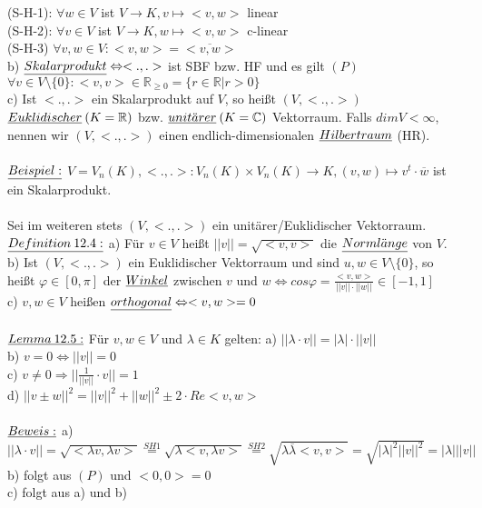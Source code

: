 \documentclass[fleqn, a4paper, 11pt]{article}
\begin{document}
(S-H-1): $\forall w\in V$ ist $V\rightarrow K,v\mapsto <v,w>$ linear\\
(S-H-2): $\forall v\in V$ ist $V\rightarrow K,w\mapsto <v,w>$ c-linear\\
(S-H-3) $\forall v,w\in V:<v,w>=\overline{<v,w>}$\\
b) $\uline{Skalarprodukt}\Leftrightarrow <.,.>$ ist SBF bzw. HF und es gilt $(P)$ $\forall v\in V\setminus\{0\}:<v,v>\in\mathbb{R}_{\geq 0}=\{r\in\mathbb{R}|r>0\}$\\
c) Ist $<.,.>$ ein Skalarprodukt auf $V$, so hei\ss{}t $(V,<.,.>)$ $\uline{Euklidischer}\:(K=\mathbb{R})$ bzw. $\uline{unit\ddot{a}rer}\:(K=\mathbb{C})$ Vektorraum. Falls $dim V<\infty$, nennen wir $(V,<.,.>)$ einen endlich-dimensionalen $\uline{Hilbertraum}$ (HR).\\
\\
$\uline{Beispiel:}$ $V=V_n(K),<.,.>:V_n(K)\times V_n(K)\rightarrow K,(v,w)\mapsto v^t\cdot \overline{w}$ ist ein Skalarprodukt.\\
\\
Sei im weiteren stets $(V,<.,.>)$ ein unit\"arer/Euklidischer Vektorraum.\\
$\uline{Definition\:12.4:}$ a) F\"ur $v\in V$ hei\ss{}t $||v||=\sqrt{<v,v>}$ die $\uline{Norml\ddot{a}nge}$ von $V$.\\
b) Ist $(V,<.,.>)$ ein Euklidischer Vektorraum und sind $u,w\in V\setminus\{0\}$, so hei\ss{}t $\varphi\in[0,\pi]$ der $\uline{Winkel}$ zwischen $v$ und $w\Leftrightarrow cos\varphi=\tfrac{<v,w>}{||v||\cdot||w||}\in [-1,1]$\\
c) $v,w\in V$ hei\ss{}en $\uline{orthogonal}\Leftrightarrow <v,w>=0$\\
\\
$\uline{Lemma\:12.5:}$ F\"ur $v,w\in V$ und $\lambda\in K$ gelten: a) $||\lambda\cdot v||=|\lambda|\cdot||v||$\\
b) $v=0\Leftrightarrow ||v||=0$\\
c) $v\neq 0\Rightarrow ||\tfrac{1}{||v||}\cdot v||=1$\\
d) $||v\pm w||^2=||v||^2+||w||^2\pm 2\cdot Re<v,w>$\\
\\
$\uline{Beweis:}$ a) $||\lambda\cdot v||=\sqrt{<\lambda v,\lambda v>}\stackrel{SH1}{=}\sqrt{\lambda <v,\lambda v>}\stackrel{SH2}{=}\sqrt{\lambda\overline{\lambda}<v,v>}=\sqrt{|\lambda |^2||v||^2}=|\lambda|||v||$\\
b) folgt aus $(P)$ und $<0,0>=0$\\
c) folgt aus a) und b)\\
\end{document}
